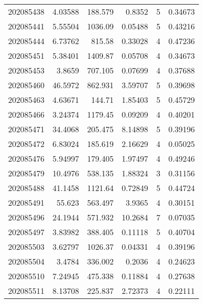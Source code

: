 \begin{tabular}{rrrrrr}
 202085438 &          4.03588 &      188.579  &            0.8352  &           5 & 0.34673 \\
 202085441 &          5.55504 &     1036.09   &            0.05488 &           5 & 0.43216 \\
 202085444 &          6.73762 &      815.58   &            0.33028 &           4 & 0.47236 \\
 202085451 &          5.38401 &     1409.87   &            0.05708 &           4 & 0.34673 \\
 202085453 &          3.8659  &      707.105  &            0.07699 &           4 & 0.37688 \\
 202085460 &         46.5972  &      862.931  &            3.59707 &           5 & 0.39698 \\
 202085463 &          4.63671 &      144.71   &            1.85403 &           5 & 0.45729 \\
 202085466 &          3.24374 &     1179.45   &            0.09209 &           4 & 0.40201 \\
 202085471 &         34.4068  &      205.475  &            8.14898 &           5 & 0.39196 \\
 202085472 &          6.83024 &      185.619  &            2.16629 &           4 & 0.05025 \\
 202085476 &          5.94997 &      179.405  &            1.97497 &           4 & 0.49246 \\
 202085479 &         10.4976  &      538.135  &            1.88324 &           3 & 0.31156 \\
 202085488 &         41.1458  &     1121.64   &            0.72849 &           5 & 0.44724 \\
 202085491 &         55.623   &      563.497  &            3.9365  &           4 & 0.30151 \\
 202085496 &         24.1944  &      571.932  &           10.2684  &           7 & 0.07035 \\
 202085497 &          3.83982 &      388.405  &            0.11118 &           5 & 0.40704 \\
 202085503 &          3.62797 &     1026.37   &            0.04331 &           4 & 0.39196 \\
 202085504 &          3.4784  &      336.002  &            0.2036  &           4 & 0.24623 \\
 202085510 &          7.24945 &      475.338  &            0.11884 &           4 & 0.27638 \\
 202085511 &          8.13708 &      225.837  &            2.72373 &           4 & 0.22111 \\

\end{tabular}
